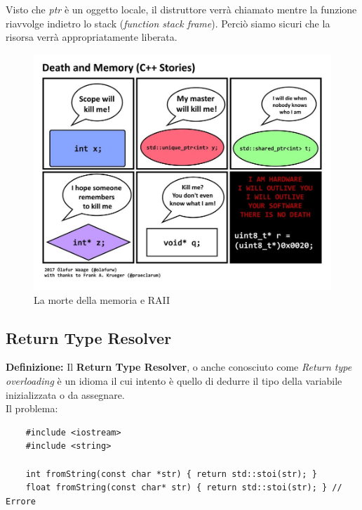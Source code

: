 \textsf{\small Visto che \emph{ptr} è un oggetto locale, il distruttore verrà chiamato mentre la funzione riavvolge indietro lo stack (\emph{function stack frame}). Perciò siamo sicuri che la risorsa verrà appropriatamente liberata.} \\

\begin{figure}[H]
	\centering
	\includegraphics[width=1\textwidth, height=1\textheight, keepaspectratio]{./imgs/death_and_memory.jpg}
	\caption{La morte della memoria e RAII}
	\label{fig:death_and_memory}
\end{figure}

\subsection{Return Type Resolver}

\textsf{\small \textbf{Definizione: } Il \textbf{Return Type Resolver}, o anche conosciuto come \emph{Return type overloading} è un idioma il cui intento è quello di dedurre il tipo della variabile inizializzata o da assegnare.} \\

\textsf{\small Il problema: } \\

\begin{lstlisting}
	#include <iostream>
	#include <string>
	
	int fromString(const char *str) { return std::stoi(str); }
	float fromString(const char* str) { return std::stoi(str); } // Errore
\end{lstlisting}

